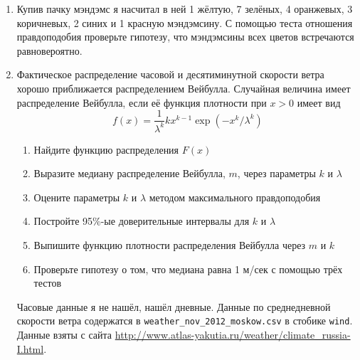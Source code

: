 \documentclass[pdftex,12pt,a4paper]{article}
\begin{document}
\begin{enumerate}
\item Купив пачку мэндэмс я насчитал в ней 1 жёлтую, 7 зелёных, 4 оранжевых, 3 коричневых, 2 синих и 1 красную мэндэмсину. С помощью теста отношения правдоподобия проверьте гипотезу, что мэндэмсины всех цветов встречаются равновероятно. 
\item \useR Фактическое распределение часовой и десятиминутной скорости ветра хорошо приближается распределением Вейбулла. Случайная величина имеет распределение Вейбулла, если её функция плотности при $x>0$ имеет вид
\[
f(x)=\frac{1}{\lambda^k}kx^{k-1}\exp(-x^k/\lambda^k)
\]
\begin{enumerate}
\item Найдите функцию распределения $F(x)$
\item Выразите медиану распределение Вейбулла, $m$, через параметры $k$ и $\lambda$
\item Оцените параметры $k$ и $\lambda$ методом максимального правдоподобия
\item Постройте 95\%-ые доверительные интервалы для $k$ и $\lambda$
\item Выпишите функцию плотности распределения Вейбулла через $m$ и $k$
\item Проверьте гипотезу о том, что медиана равна 1 м/сек с помощью трёх тестов
\end{enumerate}
Часовые данные я не нашёл, нашёл дневные. Данные по среднедневной скорости ветра содержатся в \verb|weather_nov_2012_moskow.csv| в стобике \verb|wind|. Данные взяты с сайта \url{http://www.atlas-yakutia.ru/weather/climate_russia-I.html}.

\end{enumerate}
\end{document}
